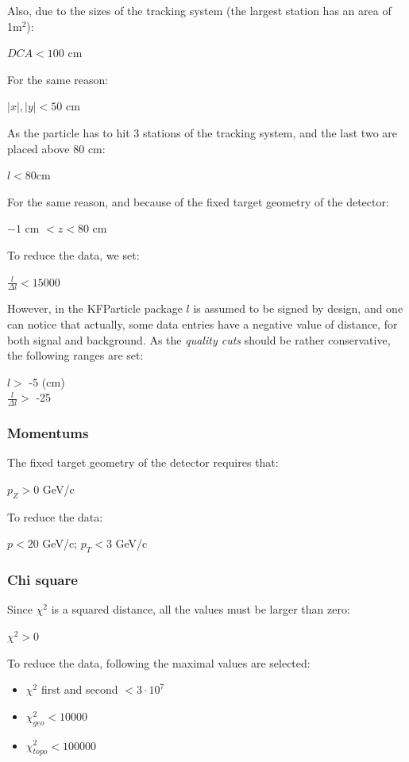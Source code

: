 Also, due to the sizes of the tracking system (the largest station has an area of 1m$^2$):
\begin{center}
    $DCA < 100 $ cm
\end{center}
For the same reason:
\begin{center}
    $|x|, |y| < 50$ cm
\end{center}
As the particle has to hit 3 stations of the tracking system, and the last two are placed above 80 cm:
\begin{center}
    $l < 80$cm
\end{center}
For the same reason, and because of the fixed target geometry of the detector:
\begin{center}
    $-1$ cm $< z < 80$ cm
\end{center}
To reduce the data, we set:
\begin{center}
    $\frac{l}{\Delta l} < 15000$
\end{center}
However, in the KFParticle package $l$ is assumed to be signed by design, and one can notice that actually, some data entries have a negative value of distance, for both signal and background. As the \emph{quality cuts} should be rather conservative, the following ranges are set:
\begin{center}
     $l >$ -5 (cm)\\
     $\frac{l}{\Delta l} >$ -25
\end{center}
\subsubsection{Momentums}
The fixed target geometry of the detector requires that:
\begin{center}
    $p_Z > 0 $ GeV/c
\end{center}
To reduce the data:
\begin{center}
    $p < 20$ GeV/c; $p_T < 3$ GeV/c
\end{center}


\subsubsection{Chi square}
Since $\chi^2$ is a squared distance, all the values must be larger than zero:
\begin{center}
    $\chi^2 > 0$
\end{center}
To reduce the data, following the maximal values are selected:
\begin{itemize}
    \item $\chi^2$ first and second $< 3 \cdot 10^7$
    \item $\chi^2_{geo} < 10000$
    \item $\chi^2_{topo} < 100000$
\end{itemize}

